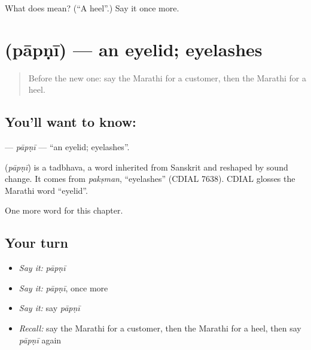 \begin{tcolorbox}[breakable,colback=teal!4,colframe=teal!35!black,title={Before you move on}]
What does  mean? (\textquotedblleft{}A heel\textquotedblright{}.) Say it once more.
\end{tcolorbox}
\section[\texorpdfstring{\mr{पापणी} (pāpṇī)}{पापणी (pāpṇī)}]{ (pāpṇī) — an eyelid; eyelashes}

\label{lesson:MR-C220-papni}



\begin{quote}
Before the new one: say the Marathi for a customer, then the Marathi for a heel.
\end{quote}

\subsection*{You'll want to know: }
\textbf{} — \emph{pāpṇī} — \textquotedblleft{}an eyelid; eyelashes\textquotedblright{}.

\begin{cousinweb}
\textbf{} (\emph{pāpṇī}) is a tadbhava, a word inherited from Sanskrit and reshaped by sound change. It comes from \emph{pakṣman}, \textquotedblleft{}eyelashes\textquotedblright{} (CDIAL 7638). CDIAL glosses the Marathi word \textquotedblleft{}eyelid\textquotedblright{}.
\end{cousinweb}

\begin{grammarlens}[title={What you've built}]
One more word for this chapter.
\end{grammarlens}

\subsection*{Your turn}
\begin{itemize}
\raggedright
  \item \emph{Say it:} \emph{pāpṇī}
  \item \emph{Say it:} \emph{pāpṇī}, once more
  \item \emph{Say it:} say \emph{pāpṇī}
  \item \emph{Recall:} say the Marathi for a customer, then the Marathi for a heel, then say \emph{pāpṇī} again
\end{itemize}

